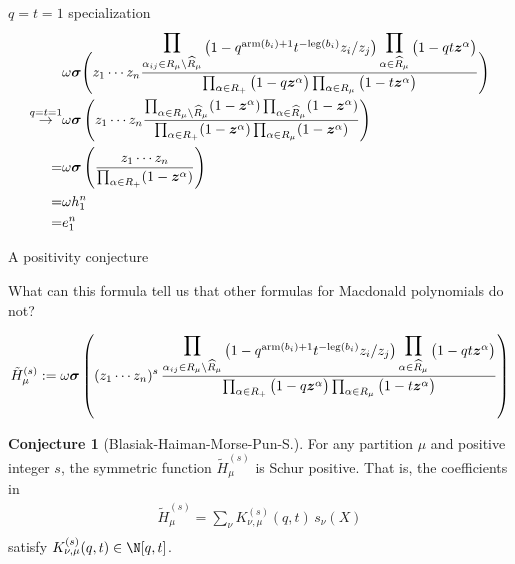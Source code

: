 \documentclass[dvipsnames]{beamer}
\newcommand{\zz}{{\boldsymbol z}}
\newcommand{\sigmabold}{\boldsymbol \sigma}
\newcommand{\Htild}{\tilde{H}}
\newcommand{\leg}{{\mathrm{leg}}}
\newcommand{\arm}{{\mathrm{arm}}}
\newcommand{\bbb}{{s}}
\theoremstyle{definition}
\newtheorem{conjecture}[theorem]{Conjecture}
\newcounter{c}
\begin{document}
\begin{frame}{\(q=t=1\) specialization}
  \begin{align*}
          & \omega \sigmabold \Bigg( z_1 \cdots z_n
\frac{
\displaystyle\prod_{\alpha_{ij} \in R_\mu \setminus \widehat{R}_\mu }
 \raisebox{-1.4mm}{$\big(1- q^{\arm(b_i)+1} t^{-\leg(b_i)} z_i/z_j \big)$}
\displaystyle\prod_{\alpha \in \widehat{R}_{\mu}}
 \raisebox{-1.4mm}{$\big(1-q  t\zz^\alpha \big)$} } {\prod_{\alpha \in R_+} \big(1-q  \zz^\alpha\big)
\prod_{\alpha \in R_\mu} \big(1-t  \zz^\alpha\big)} 
           \Bigg) \\
    \overset{q=t=1}{\to} & \omega \sigmabold \left( z_1\cdots z_n
    \frac{\prod_{\alpha \in R_\mu \setminus \widehat{R}_\mu}
    (1-\zz^\alpha) \prod_{\alpha \in \widehat{R}_\mu}(1-\zz^\alpha)}{\prod_{\alpha \in R_+}
    (1-\zz^\alpha) \prod_{\alpha \in R_\mu} (1-\zz^\alpha)}\right) \\
    = & \omega \sigmabold\left(\frac{z_1 \cdots z_n}{\prod_{\alpha \in R_+}
      (1-\zz^\alpha)}\right) \\
    = & \omega h_1^n \\
    = & e_1^n
  \end{align*}
\end{frame}
\begin{frame}{A positivity conjecture}
  \begin{center}
What can this formula tell us that other formulas for Macdonald polynomials do not?
\end{center}
\pause


\vspace{-3mm}
\vspace{-1mm}
{\small \begin{align*}
  \Htild^{(s)}_{\mu} := \omega \sigmabold  \left( (z_1\cdots z_n)^s \,
\frac{
 \displaystyle\prod_{\alpha_{ij} \in R_\mu \setminus \widehat{R}_\mu }
 \raisebox{-1.4mm}{$\big(1- q^{\arm(b_i)+1} t^{-\leg(b_i)} z_i/z_j \big)$}
\displaystyle\prod_{\alpha \in \widehat{R}_{\mu}}
 \raisebox{-1.4mm}{$\big(1-q  t \zz^\alpha \big)$} } {\prod_{\alpha \in R_+} \big(1-q  \zz^\alpha\big)
\prod_{\alpha \in R_\mu} \big(1-t  \zz^\alpha\big)}\right)
\end{align*}}


\vspace{-1.4mm}
\begin{conjecture}[Blasiak-Haiman-Morse-Pun-S.]
For any partition  $\mu$ and positive integer $s$, the symmetric function
 $\Htild^{(s)}_{\mu}$ is Schur positive.
That is, the coefficients in
\vspace{-1mm}
\begin{align*}
\Htild^{(s)}_{\mu}
= \sum_{\nu } K^{(s)} _{\nu , \mu}(q,t)\, s_\nu(X)  \\[-10mm]
\end{align*}
satisfy $K^{(\bbb)}_{\nu , \mu}(q,t)\in \N[q,t]$.
\end{conjecture}
\end{frame}
\end{document}
